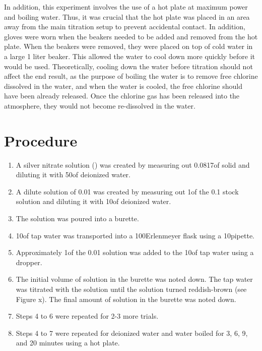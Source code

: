 \documentclass[11pt]{article}
\begin{document}
In addition, this experiment involves the use of a hot plate at maximum power and boiling water. Thus, it was crucial that the hot plate was placed in an area away from the main titration setup to prevent accidental contact. In addition, gloves were worn when the beakers needed to be added and removed from the hot plate. When the beakers were removed, they were placed on top of cold water in a large 1 liter beaker. This allowed the water to cool down more quickly before it would be used. Theoretically, cooling down the water before titration should not affect the end result, as the purpose of boiling the water is to remove free chlorine dissolved in the water, and when the water is cooled, the free chlorine should have been already released. Once the chlorine gas has been released into the atmosphere, they would not become re-dissolved in the water.

\section{Procedure}

\begin{enumerate}
	\item A silver nitrate solution () was created by measuring out 0.0817\g of solid  and diluting it with 50\ml of deionized water.
	\item A dilute solution of 0.01\mpl {} was created by measuring out 1\ml of the 0.1\mpl {} stock solution and diluting it with 10\ml of deionized water.
	\item The  solution was poured into a burette.
	\item 10\ml of tap water was transported into a 100\ml Erlenmeyer flask using a 10\ml pipette.
	\item Approximately 1\ml of the 0.01\mpl {} solution was added to the 10\ml of tap water using a dropper.
	\item The initial volume of  solution in the burette was noted down. The tap water was titrated with the  solution until the solution turned reddish-brown (see Figure x). The final amount of solution in the burette was noted down.
	\item Steps 4 to 6 were repeated for 2-3 more trials.
	\item Steps 4 to 7 were repeated for deionized water and water boiled for 3, 6, 9, and 20 minutes using a hot plate.
\end{enumerate}
\end{document}

